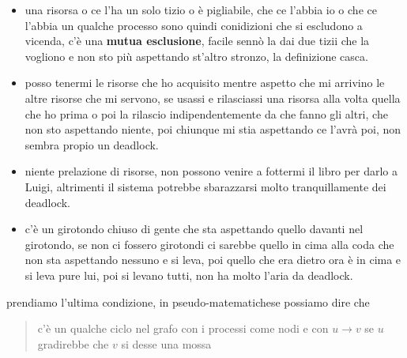 \documentclass[11pt]{article}
\begin{document}
\begin{itemize}
\item una risorsa o ce l'ha un solo tizio o è pigliabile, che ce l'abbia io o che ce
l'abbia un qualche processo sono quindi conidizioni che si
escludono a vicenda, c'è una \textbf{mutua esclusione}, facile sennò la
dai due tizii che la vogliono e non sto più aspettando st'altro
stronzo, la definizione casca.

\item posso tenermi le risorse che ho acquisito mentre aspetto che mi arrivino le altre
risorse che mi servono, se usassi e rilasciassi una risorsa alla volta
quella che ho prima o poi la rilascio indipendentemente da che
fanno gli altri, che non sto aspettando niente, poi chiunque mi
stia aspettando ce l'avrà poi, non sembra propio un deadlock.

\item niente prelazione di risorse, non possono venire a fottermi il
libro per darlo a Luigi, altrimenti il sistema potrebbe
sbarazzarsi molto tranquillamente dei deadlock.

\item c'è un girotondo chiuso di gente che sta aspettando quello davanti
nel girotondo, se non ci fossero girotondi ci sarebbe quello in
cima alla coda che non sta aspettando nessuno e si leva, poi quello
che era dietro ora è in cima e si leva pure lui, poi si levano
tutti, non ha molto l'aria da deadlock.
\end{itemize}

prendiamo l'ultima condizione, in pseudo-matematichese possiamo dire
che
\begin{quote}
c'è un qualche ciclo nel grafo con i processi come nodi e con \(u \to
v\) se \(u\) gradirebbe che \(v\) si desse una mossa
\end{quote}
\end{document}
